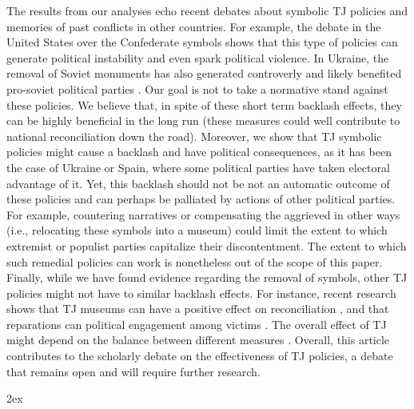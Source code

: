 \documentclass[12pt, notitlepage]{article}
\begin{document}
The results from our analyses echo recent debates about symbolic TJ policies and memories of past conflicts in other countries. For example, the debate in the United States over the Confederate symbols shows that this type of policies can generate political instability and even spark political violence. In Ukraine, the removal of Soviet monuments has also generated controverly and likely benefited pro-soviet political parties \citep{Rozenas:2021}. Our goal is not to take a normative stand against these policies. We believe that, in spite of these short term backlash effects, they can be highly beneficial in the long run (these measures could well contribute to national reconciliation down the road). Moreover, we  show that TJ symbolic policies might cause a backlash and have political consequences, as it has been the case of Ukraine or Spain, where some political parties have taken electoral advantage of it. Yet, this backlash should not be not an automatic outcome of these policies and can perhaps be palliated by actions of other political parties. For example, countering narratives or compensating the aggrieved in other ways (i.e., relocating these symbols into a museum) could limit the extent to which extremist or populist parties capitalize their discontentment. The extent to which such remedial policies can work is nonetheless out of the scope of this paper. Finally, while we have found evidence regarding the removal of symbols, other TJ policies might not have to similar backlash effects. For instance, recent research shows that TJ museums can have a positive effect on reconciliation \citep{Balcells:2020aa}, and that reparations can political engagement among victims \citep{voytas:2021}. The overall effect of TJ might depend on the balance between different measures \citep{Olsen:2010aa, Loyle:2017aa}.
Overall, this article contributes to the scholarly debate on the effectiveness of TJ policies, a debate that remains open and will require further research.




\newpage
\begingroup
\parindent 0pt
\parskip 2ex
\def\enotesize{\normalsize}
\theendnotes
\endgroup

\clearpage



\newpage

\end{document}
